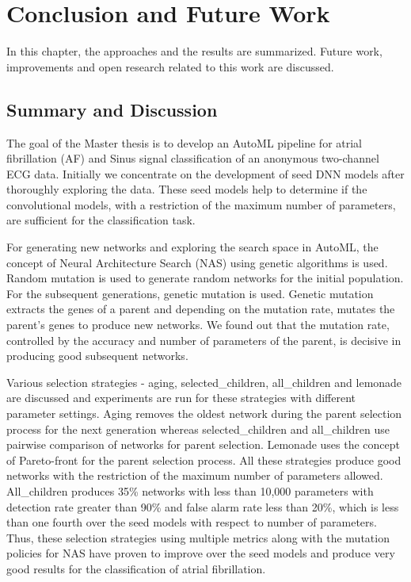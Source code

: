 \chapter{Conclusion and Future Work}
\label{chap:conclusion_and_future_work}
 In this chapter, the approaches and the results are summarized. Future work, improvements and open research related to this work are discussed.
 
 \section{Summary and Discussion}
 \label{sec:sumary_and_discussion}
 
The goal of the Master thesis is to develop an AutoML pipeline for atrial fibrillation (AF) and Sinus signal classification of an anonymous two-channel ECG data. Initially we concentrate on the development of seed DNN models after thoroughly exploring the data. These seed models help to determine if the convolutional models, with a restriction of the maximum number of parameters, are sufficient for the classification task. 
 
For generating new networks and exploring the search space in AutoML, the concept of Neural Architecture Search (NAS) using genetic algorithms is used. Random mutation is used to generate random networks for the initial population. For the subsequent generations, genetic mutation is used. Genetic mutation extracts the genes of a parent and depending on the mutation rate, mutates the parent's genes to produce new networks. We found out that the mutation rate, controlled by the accuracy and number of parameters of the parent, is decisive in producing good subsequent networks. 

Various selection strategies - aging, selected\_children, all\_children and lemonade are discussed and experiments are run for these strategies with different parameter settings. Aging removes the oldest network during the parent selection process for the next generation whereas selected\_children and all\_children use pairwise comparison of networks for parent selection. Lemonade uses the concept of Pareto-front for the parent selection process. All these strategies produce good networks with the restriction of the maximum number of parameters allowed. All\_children produces 35\% networks with less than 10,000 parameters with detection rate greater than 90\% and false alarm rate less than 20\%, which is less than one fourth over the seed models with respect to number of parameters. Thus, these selection strategies using multiple metrics along with the mutation policies for NAS have proven to improve over the seed models and produce very good results for the classification of atrial fibrillation.

